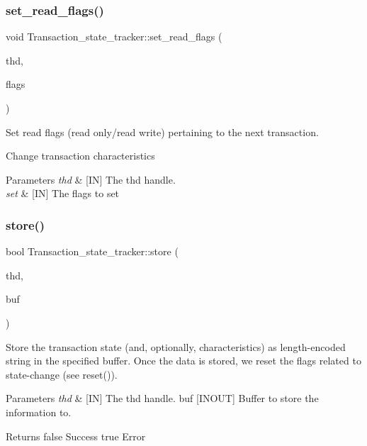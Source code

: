 \subsubsection{\texorpdfstring{set\+\_\+read\+\_\+flags()}{set\_read\_flags()}}
{\footnotesize\ttfamily void Transaction\+\_\+state\+\_\+tracker\+::set\+\_\+read\+\_\+flags (\begin{DoxyParamCaption}\item[{T\+HD $\ast$}]{thd,  }\item[{enum enum\+\_\+tx\+\_\+read\+\_\+flags}]{flags }\end{DoxyParamCaption})}



Set read flags (read only/read write) pertaining to the next transaction. 

Change transaction characteristics


\begin{DoxyParams}{Parameters}
{\em thd} & \mbox{[}IN\mbox{]} The thd handle. \\
\hline
{\em set} & \mbox{[}IN\mbox{]} The flags to set \\
\hline
\end{DoxyParams}
\mbox{\label{classTransaction__state__tracker_a7f7843e53238fdc98ee31ac07b2376e2}} 
\subsubsection{\texorpdfstring{store()}{store()}}
{\footnotesize\ttfamily bool Transaction\+\_\+state\+\_\+tracker\+::store (\begin{DoxyParamCaption}\item[{T\+HD $\ast$}]{thd,  }\item[{String \&}]{buf }\end{DoxyParamCaption})\hspace{0.3cm}{\ttfamily [virtual]}}



Store the transaction state (and, optionally, characteristics) as length-\/encoded string in the specified buffer. Once the data is stored, we reset the flags related to state-\/change (see reset()). 


\begin{DoxyParams}{Parameters}
{\em thd} & \mbox{[}IN\mbox{]} The thd handle.  buf \mbox{[}I\+N\+O\+UT\mbox{]} Buffer to store the information to.\\
\hline
\end{DoxyParams}
\begin{DoxyReturn}{Returns}
false Success true Error 
\end{DoxyReturn}



